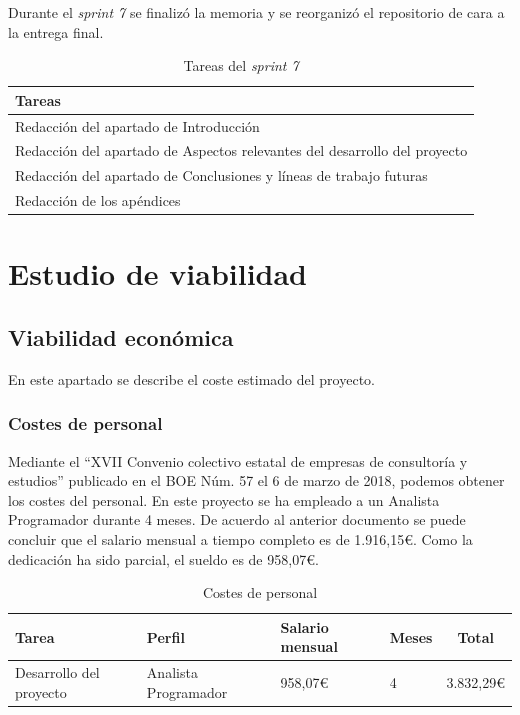 Durante el \textit{sprint 7} se finalizó la memoria y se reorganizó el repositorio de cara a la entrega final.

\begin{table}[H]
    \centering
    \begin{tabular}{l}
    \hline
    \textbf{Tareas} \\ \hline
    Redacción del apartado de Introducción \\
    Redacción del apartado de Aspectos relevantes del desarrollo del proyecto \\
    Redacción del apartado de Conclusiones y líneas de trabajo futuras \\
    Redacción de los apéndices \\ \hline
    \end{tabular}
    \caption{Tareas del \textit{sprint 7}}
    \label{tab:tasks_sprint7}
\end{table}

\section{Estudio de viabilidad}

\subsection{Viabilidad económica}

En este apartado se describe el coste estimado del proyecto.

\subsubsection{Costes de personal}

Mediante el ``XVII Convenio colectivo estatal de empresas de consultoría y estudios'' publicado en el BOE Núm. 57 el 6 de marzo de 2018, podemos obtener los costes del personal. En este proyecto se ha empleado a un Analista Programador durante 4 meses. De acuerdo al anterior documento se puede concluir que el salario mensual a tiempo completo es de 1.916,15€. Como la dedicación ha sido parcial, el sueldo es de 958,07€.

\begin{table}[H]
    \centering
    \begin{tabular}{p{}lll|c}
    \hline
    \textbf{Tarea} & \textbf{Perfil} & \textbf{Salario mensual} & \textbf{Meses} & \textbf{Total} \\ \hline
    Desarrollo del proyecto & Analista Programador & 958,07€ & 4 & 3.832,29€ \\ \hline
    \end{tabular}
    \caption{Costes de personal}
    \label{tab:coste_personal}
\end{table}


